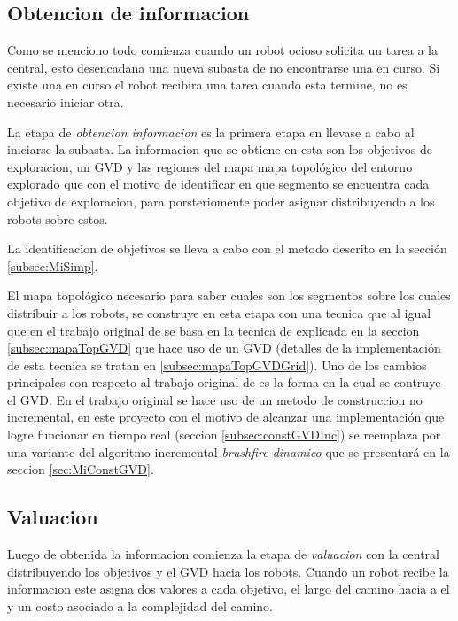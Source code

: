 \subsection{Obtencion de informacion}
Como se menciono todo comienza cuando un robot ocioso solicita un tarea a la
central, esto desencadana una nueva subasta de no encontrarse una en curso. Si
existe una en curso el robot recibira una tarea cuando esta termine, no es
necesario iniciar otra.

La etapa de \emph{obtencion informacion} es la primera etapa en llevase a cabo
al iniciarse la subasta. La informacion que se obtiene en esta son los
objetivos de exploracion, un GVD y las regiones del mapa mapa topológico del
entorno explorado que con el motivo de identificar en que segmento se encuentra
cada objetivo de exploracion, para porsteriomente poder asignar distribuyendo a
los robots sobre estos. 

La identificacion de objetivos se lleva a cabo con el metodo descrito en la
sección \ref{subsec:MiSimp}.

El mapa topológico necesario para saber cuales son los segmentos sobre
los cuales distribuir a los robots, se construye en esta etapa con una
tecnica que al igual que en el trabajo original de
\cite{wurm2008coordinated} se basa en la tecnica de \cite{Thrun1998}
explicada en la seccion \ref{subsec:mapaTopGVD} que hace uso de 
un GVD (detalles de la implementación de esta tecnica se tratan en
\ref{subsec:mapaTopGVDGrid}). Uno de los cambios principales con
respecto al trabajo original de \cite{wurm2008coordinated} es la forma
en la cual se contruye el GVD. En el trabajo original se hace uso de un
metodo de construccion no incremental, en este proyecto con el motivo de
alcanzar una implementación que logre funcionar en tiempo real (seccion
\ref{subsec:constGVDInc}) se reemplaza por una variante del algoritmo
incremental \emph{brushfire dinamico} que se presentará en la seccion
\ref{sec:MiConstGVD}.


\subsection{Valuacion} \label{subsec:MiValSub}

Luego de obtenida la informacion comienza la etapa de \emph{valuacion}
con la central distribuyendo los objetivos y el GVD hacia los robots. Cuando un
robot recibe la informacion este asigna dos valores a cada objetivo, el largo
del camino hacia a el y un costo asociado a la complejidad del camino.

